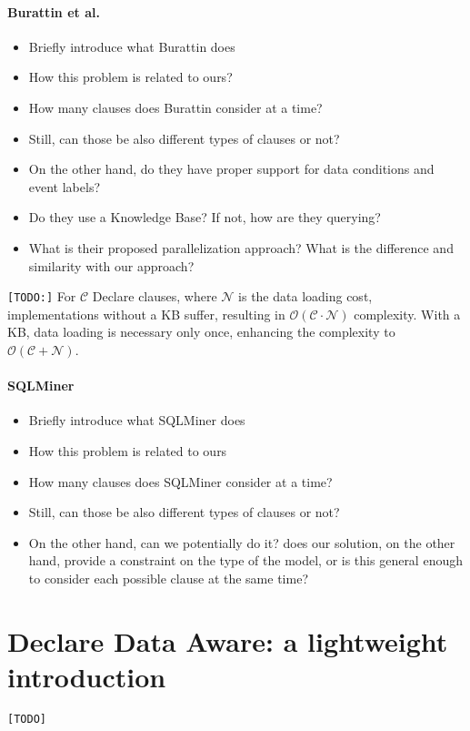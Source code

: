 \documentclass[11pt]{article}
\begin{document}
\paragraph*{Burattin et al.} \cite{BurattinMS16}
\begin{itemize}
\item{Briefly introduce what Burattin does}
\item{How this problem is related to ours?}
\item{How many clauses does Burattin consider at a time?}
\item{Still, can those be also different types of clauses or not?}
\item{On the other hand, do they have proper support for data conditions and event labels?}
\item{Do they use a Knowledge Base? If not, how are they querying?}
\item{What is their proposed parallelization approach? What is the difference and similarity with our approach?}
\end{itemize}
\texttt{\color{red}[TODO:]}  For $\mathcal{C}$ Declare clauses, where $\mathcal{N}$ is the data loading cost, implementations without a KB suffer, resulting in $\mathcal{O(C \cdot N)}$ complexity. With a KB, data loading is necessary only once, enhancing the complexity to $\mathcal{O(C + N)}$.

\paragraph*{SQLMiner} \cite{SchonigRCJM16,Schonig15}
\begin{itemize}
\item{Briefly introduce what SQLMiner does}
\item{How this problem is related to ours}
\item{How many clauses does SQLMiner consider at a time?}
\item{Still, can those be also different types of clauses or not?}
\item{On the other hand, can we potentially do it? does our solution, on the other hand, provide a constraint on the type of the model, or is this general enough to consider each possible clause at the same time?}
\end{itemize}




\section{Declare Data Aware: a lightweight introduction}\label{sec:DAD}
\texttt{\color{red}[TODO]}

 
 
\end{document}
